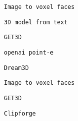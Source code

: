          
         
          \protect\hypertarget{ID_391029099}{}{}

\begin{verbatim}
Image to voxel faces
\end{verbatim}
         

         
         
          \protect\hypertarget{ID_356115750}{}{}

\begin{verbatim}
3D model from text
\end{verbatim}

           
           
            \protect\hypertarget{ID_14970074}{}{}

\begin{verbatim}
GET3D
\end{verbatim}
           

           
           
            \protect\hypertarget{ID_1174553077}{}{}

\begin{verbatim}
openai point-e
\end{verbatim}
           

           
           
            \protect\hypertarget{ID_789584940}{}{}

\begin{verbatim}
Dream3D
\end{verbatim}
           
         

         
         
          \protect\hypertarget{ID_1013966953}{}{}

\begin{verbatim}
Image to voxel faces
\end{verbatim}
         

         
         
          \protect\hypertarget{ID_490108570}{}{}

\begin{verbatim}
GET3D
\end{verbatim}
         

         
         
          \protect\hypertarget{ID_600804649}{}{}

\begin{verbatim}
Clipforge
\end{verbatim}
         

